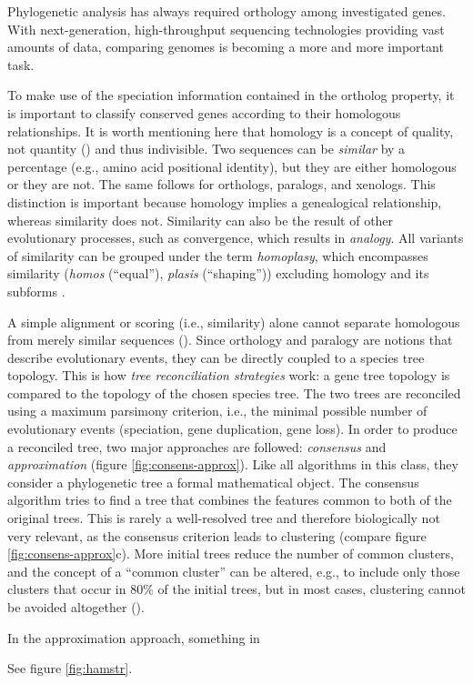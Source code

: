 Phylogenetic analysis has always required orthology among investigated genes.
With next-generation, high-throughput sequencing technologies providing vast
amounts of data, comparing genomes is becoming a more and more important task. 

To make use of the speciation information contained in the ortholog property, it
is important to classify conserved genes according to their homologous
relationships. It is worth mentioning here that homology is a concept of
quality, not quantity (\cite{reeck1987}) and thus indivisible. Two sequences can
be \emph{similar} by a percentage (e.g., amino acid positional identity), but
they are either homologous or they are not. The same follows for orthologs,
paralogs, and xenologs. This distinction is important because homology implies a
genealogical relationship, whereas similarity does not. Similarity can also be
the result of other evolutionary processes, such as convergence, which results
in \emph{analogy}. All variants of similarity can be grouped under the term
\emph{homoplasy}, which encompasses similarity (\emph{homos} (``equal''),
\emph{plasis} (``shaping'')) excluding homology and its subforms \cite{page1998}.

A simple alignment or scoring (i.e., similarity) alone cannot separate
homologous from merely similar sequences (\cite{eisen1998}). Since orthology and
paralogy are notions that describe evolutionary events, they can be directly
coupled to a species tree topology. This is how \emph{tree reconciliation
strategies} work: a gene tree topology is compared to the topology of the chosen
species tree. The two trees are reconciled using a maximum parsimony criterion,
i.e., the minimal possible number of evolutionary events (speciation, gene
duplication, gene loss). In order to produce a reconciled tree, two major
approaches are followed: \emph{consensus} and \emph{approximation} (figure
\ref{fig:consens-approx}). Like all algorithms in this class, they consider a
phylogenetic tree a formal mathematical object. The consensus algorithm tries to
find a tree that combines the features common to both of the original trees.
This is rarely a well-resolved tree and therefore biologically not very
relevant, as the consensus criterion leads to clustering (compare figure
\ref{fig:consens-approx}c). More initial trees reduce the number of common
clusters, and the concept of a ``common cluster'' can be altered, e.g., to
include only those clusters that occur in 80\% of the initial trees, but in most
cases, clustering cannot be avoided altogether (\cite{mirkin1995}).

In the approximation approach, 
something in \cite{page1997}



See figure \ref{fig:hamstr}.

